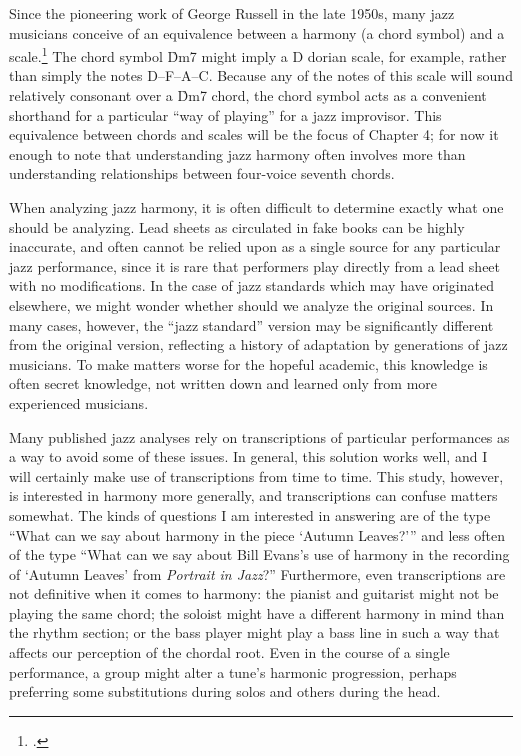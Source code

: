 Since the pioneering work of George Russell in the late 1950s, many jazz
musicians conceive of an equivalence between a harmony (a chord symbol) and a
scale.\footcite{russell:lcc} The chord symbol \h{Dm7} might imply a D dorian
scale, for example, rather than simply the notes D--F--A--C. Because any of
the notes of this scale will sound relatively consonant over a \h{Dm7} chord,
the chord symbol acts as a convenient shorthand for a particular “way of
playing” for a jazz improvisor. This equivalence between chords and scales
will be the focus of Chapter 4; for now it enough to note that understanding
jazz harmony often involves more than understanding relationships between
four-voice seventh chords.

When analyzing jazz harmony, it is often difficult to determine exactly what
one should be analyzing. Lead sheets as circulated in fake books can be highly
inaccurate, and often cannot be relied upon as a single source for any
particular jazz performance, since it is rare that performers play directly
from a lead sheet with no modifications. In the case of jazz
standards which may have originated elsewhere, we might wonder whether should
we analyze the original sources. In many cases, however, the “jazz standard”
version may be significantly different from the original version, reflecting a
history of adaptation by generations of jazz musicians. To make
matters worse for the hopeful academic, this knowledge is often secret
knowledge, not written down and learned only from more experienced musicians.

Many published jazz analyses rely on transcriptions of particular performances
as a way to avoid some of these issues. In general, this solution works well,
and I will certainly make use of transcriptions from time to time. This study, however,
is interested in harmony more generally, and transcriptions can confuse
matters somewhat. The kinds of questions I am interested in answering are of
the type “What can we say about harmony in the piece ‘Autumn Leaves?’” and
less often of the type “What can we say about Bill Evans’s use of harmony in
the recording of ‘Autumn Leaves’ from \emph{Portrait in Jazz}?” Furthermore,
even transcriptions are not definitive when it comes to harmony: the pianist
and guitarist might not be playing the same chord; the soloist might have a
different harmony in mind than the rhythm section; or the bass player might
play a bass line in such a way that affects our perception of the chordal
root. Even in the course of a single performance, a group might alter a tune’s
harmonic progression, perhaps preferring some substitutions during solos and
others during the head.

